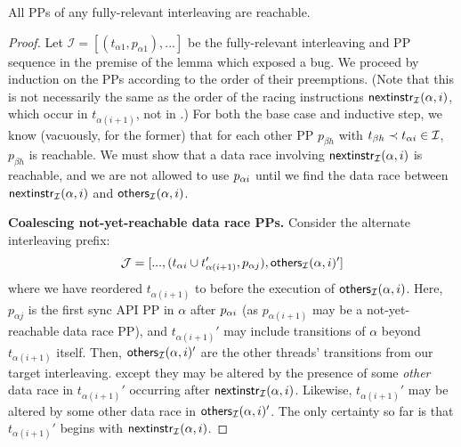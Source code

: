\begin{lemma}
	All PPs of any fully-relevant interleaving are reachable.
	\label{lem:saturation}
\end{lemma}

\newcommand\pbh{\ensuremath{p_{\beta{}h}}}
\newcommand\paj{\ensuremath{p_{\alpha{}j}}}
\newcommand\pbk{\ensuremath{p_{\beta{}k}}}
\newcommand\tbh{\ensuremath{t_{\beta{}h}}}
\newcommand\coalesce[1]{\ensuremath{\mathsf{coalesce}(#1)}}

\begin{proof}
Let $\mathcal{I} = [(t_{\alpha{}1}, p_{\alpha{}1}), ...]$ be the fully-relevant interleaving and PP sequence in the premise of the lemma which exposed a bug.
We proceed by induction on the PPs according to the order of their preemptions.
(Note that this is not necessarily the same as the order of the racing instructions $\mathsf{nextinstr}_{\mathcal{I}}(\alpha,i)$, which occur in $t_{\alpha{}(i+1)}$, not in \tai.)
For both the base case and inductive step, we know (vacuously, for the former) that for each other PP $\pbh$ with $\tbh \prec \tai \in \mathcal{I}$, $\pbh$ is reachable.
We must show that a data race involving $\mathsf{nextinstr}_{\mathcal{I}}(\alpha,i)$
is reachable, and we are not allowed to use $p_{\alpha{}i}$ until we find the data race between $\mathsf{nextinstr}_{\mathcal{I}}(\alpha,i)$ and $\mathsf{others}_{\mathcal{I}}(\alpha,i)$.

{\bf Coalescing not-yet-reachable data race PPs.}
Consider the alternate interleaving prefix:
\[
	\mathcal{J} = [..., (\tai \cup t_{\alpha{}(i+1)}', \paj), \ppothers{\mathcal{I}}{\alpha}{i}' ]
\]
where we have reordered $t_{\alpha{}(i+1)}$ to before the execution of $\mathsf{others}_{\mathcal{I}}(\alpha,i)$.
Here, $\paj$ is the first sync API PP in $\alpha$ after $p_{\alpha{}i}$ (as $p_{\alpha(i+1)}$ may be a not-yet-reachable data race PP),
and $t_{\alpha{}(i+1)}'$ may include transitions of $\alpha$ beyond $t_{\alpha{}(i+1)}$ itself.
Then, $\mathsf{others}_{\mathcal{I}}(\alpha,i)'$ are the other threads' transitions from our target interleaving.
except they may be altered by the presence of some {\em other} data race in $t_{\alpha{}(i+1)}'$ occurring after $\mathsf{nextinstr}_{\mathcal{I}}(\alpha,i)$.
Likewise, $t_{\alpha{}(i+1)}'$ may be altered by some other data race in $\mathsf{others}_{\mathcal{I}}(\alpha,i)'$.
The only certainty so far is that $t_{\alpha{}(i+1)}'$ begins with $\mathsf{nextinstr}_{\mathcal{I}}(\alpha,i)$.


\end{proof}
